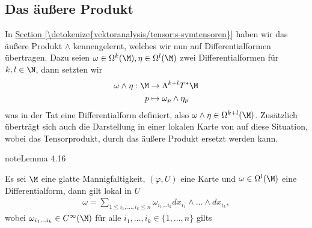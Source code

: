 \documentclass[letterpaper,10pt,english]{jupyterBook}
\begin{document}
\subsection{Das äußere Produkt}
\label{\detokenize{manifolds/diffformen:das-auszere-produkt}}
\sphinxAtStartPar
In \hyperref[\detokenize{vektoranalysis/tensor:s-symtensoren}]{Section \ref{\detokenize{vektoranalysis/tensor:s-symtensoren}}} haben wir das äußere Produkt \(\wedge\) kennengelernt, welches wir nun auf Differentialformen übertragen. Dazu seien \(\omega\in \Omega^k(\M), \eta\in \Omega^l(\M)\) zwei Differentialformen für \(k,l\in\N\), dann setzten wir
\begin{equation*}
\begin{split}\omega \wedge \eta:\M &\to \Lambda^{k+l}T^\ast\M\\
p&\mapsto \omega_p \wedge \eta_p\end{split}
\end{equation*}
\sphinxAtStartPar
was in der Tat eine Differentialform definiert, also \(\omega\wedge\eta \in \Omega^{k+l}(\M)\). Zusätzlich überträgt sich auch die Darstellung in einer lokalen Karte von {\hyperref[\detokenize{manifolds/tangential:cor:tensorfieldchart}]{}} auf diese Situation, wobei das Tensorprodukt, durch das äußere Produkt ersetzt werden kann.
\label{manifolds/diffformen:lemma-3}
\begin{sphinxadmonition}{note}{Lemma 4.16}



\sphinxAtStartPar
Es sei \(\M\) eine glatte Mannigfaltigkeit, \((\varphi,U)\) eine Karte und \(\omega\in\Omega^l(\M)\) eine Differentialform, dann gilt lokal in \(U\)
\begin{equation*}
\begin{split}\omega = \sum_{1\leq i_1,\ldots,i_k \leq n}\omega_{i_1\ldots i_k}
dx_{i_1}\wedge\ldots\wedge dx_{i_k},\end{split}
\end{equation*}
\sphinxAtStartPar
wobei \(\omega_{i_1\ldots i_k}\in C^\infty(\M)\) für alle \(i_1,\ldots,i_k\in\{1,\ldots,n\}\) gilts
\end{sphinxadmonition}
\end{document}
